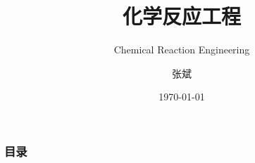 \documentclass[aspectratio=169,12pt,t]{beamer}
\title{化学反应工程}
\subtitle{Chemical Reaction Engineering}
\author{张斌}
\institute[河北农业大学 理工系]{河北农业大学 理工系}
\date{\today}
\begin{document}
	\begin{frame}
		\titlepage
	\end{frame}
	\begin{frame}
		\frametitle{目录}
		\tableofcontents
	\end{frame}









\end{document}
